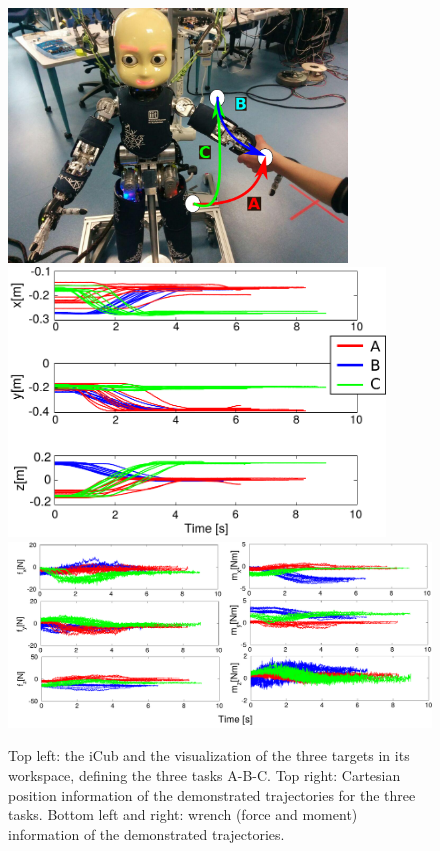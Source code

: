 \documentclass[utf8]{frontiersSCNS} %
\begin{document}
\begin{figure}[h]
\centering
\includegraphics[width=9cm]{img/experimentRepresentation.pdf}\includegraphics[width=10cm]{img/realTrajectories2.pdf}\\
\includegraphics[width=18cm]{img/realTrajectoriesv2.pdf}
\caption{Top left: the iCub and the visualization of the three targets in its workspace, defining the three tasks A-B-C. Top right: Cartesian position information of the demonstrated trajectories for the three tasks. Bottom left and right: wrench (force and moment) information of the demonstrated trajectories.
}
\label{fig:realAppli}
\end{figure}
\end{document}
